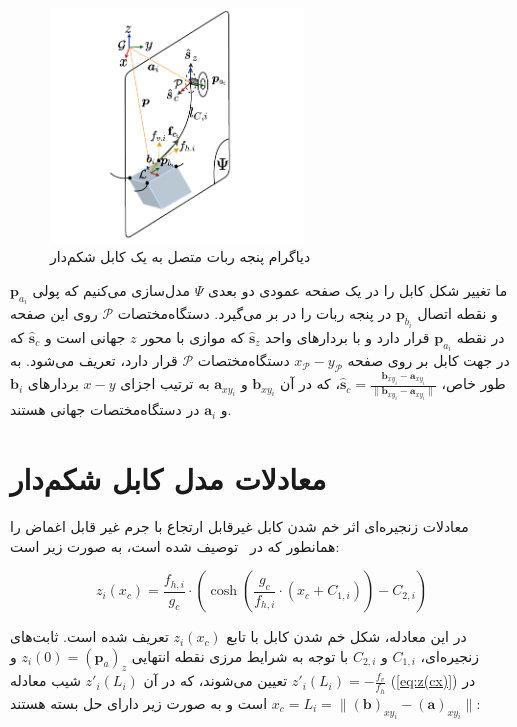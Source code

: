 \begin{figure}[t]
	\centering
	\includegraphics[width=0.6\textwidth]{img/robot_frame.pdf}
	\caption{دیاگرام پنجه ربات متصل به یک کابل  شکم‌دار}
	\label{fig:frame_robot}
\end{figure}

ما تغییر شکل کابل را در یک صفحه عمودی دو بعدی $\Psi$ مدل‌سازی می‌کنیم که پولی $\bm{p}_{a_i}$ و نقطه اتصال $\bm{p}_{b_i}$ در پنجه ربات را در بر می‌گیرد. دستگاه‌مختصات
$\mathcal{P}$
روی این صفحه در نقطه $\bm{p}_{a_i}$ قرار دارد و با بردارهای واحد $\hat{\bm{s}}_z$ که موازی با محور $z$ جهانی است و $\hat{\bm{s}}_c$ که در جهت کابل بر روی صفحه $x_{\mathcal{P}}-y_{\mathcal{P}}$  دستگاه‌مختصات $\mathcal{P}$ قرار دارد، تعریف می‌شود.
به طور خاص،  $\hat{\bm{s}}_c = \frac{\bm{b}_{xy_i} - \bm{a}_{xy_i}}{\|\bm{b}_{xy_i} - \bm{a}_{xy_i}\|}$، که در آن $\bm{b}_{xy_i}$ و $\bm{a}_{xy_i}$ به ترتیب اجزای $x-y$ بردارهای $\bm{b}_{i}$ و $\bm{a}_{i}$ در دستگاه‌مختصات جهانی هستند.

\section{معادلات مدل کابل شکم‌دار} \label{seq:modeling}

معادلات زنجیره‌ای اثر خم شدن کابل غیرقابل ارتجاع با جرم غیر قابل اغماض را همانطور که در~\cite{pott2013cable} توصیف شده است، به صورت زیر است:

\begin{equation} \label{eq:z(cx)}
	z_i(x_c) = \frac{f_{h,i}}{g_c} \cdot \left( \cosh \left( \frac{g_c}{f_{h,i}} \cdot (x_c + C_{1,i}) \right) - C_{2,i} \right)
\end{equation} 

در این معادله، شکل خم شدن کابل با تابع $z_i(x_c)$ تعریف شده است. ثابت‌های زنجیره‌ای، $C_{1,i}$ و $C_{2,i}$ با توجه به شرایط مرزی نقطه انتهایی $z_i(0)=(\bm{p}_{a})_z$ و $z'_i(L_i)=-\frac{f_v}{f_h}$ تعیین می‌شوند، که در آن $z'_i(L_i)$ شیب معادله (\ref{eq:z(cx)}) در \(x_c = L_i = \|(\bm{b})_{xy_i} - (\bm{a})_{xy_i}\|\) است و به صورت زیر دارای ‌حل بسته هستند:

